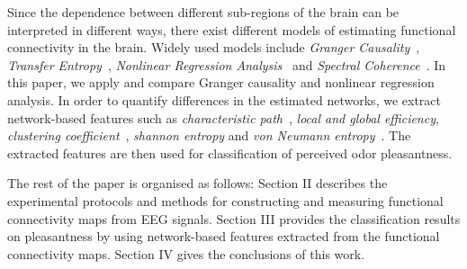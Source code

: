 Since the dependence between different sub-regions of the brain can be interpreted in different ways, there exist different models of estimating functional connectivity in the brain. Widely used models include \emph{Granger Causality}~\cite{granger1969investigating}, \emph{Transfer Entropy}~\cite{schreiber2000measuring}, \emph{Nonlinear Regression Analysis}~\cite{pijn1990localization} and \emph{Spectral Coherence}~\cite{sun2004measuring}. In this paper, we apply and compare Granger causality and nonlinear regression analysis. In order to quantify differences in the estimated networks, we extract network-based features such as \emph{characteristic path}~\cite{watts1998collective}, \emph{local and global efficiency}, \emph{clustering coefficient}~\cite{latora2001efficient}, \emph{shannon entropy} and \emph{von Neumann entropy}~\cite{passerini2008neumann}. The extracted features are then used for classification of perceived odor pleasantness. 

The rest of the paper is organised as follows: Section II describes the experimental protocols and methods for constructing and measuring functional connectivity maps from EEG signals. Section III provides the classification results on pleasantness by using network-based features extracted from the functional connectivity maps. Section IV gives the conclusions of this work. 